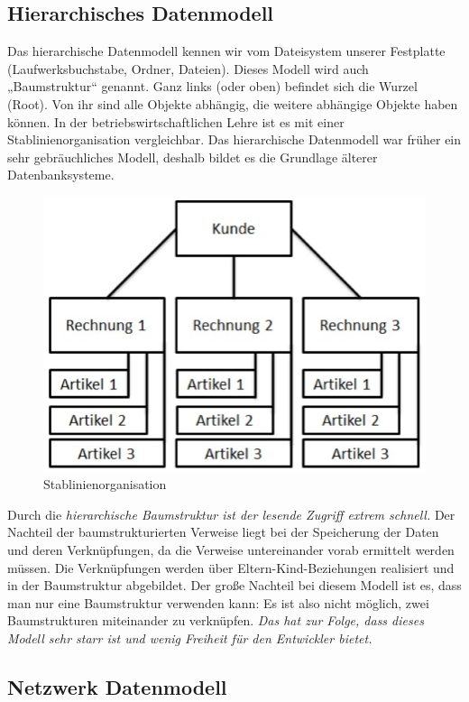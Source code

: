 \subsection{Hierarchisches Datenmodell}

Das hierarchische Datenmodell kennen wir vom Dateisystem unserer Festplatte (Laufwerksbuchstabe, Ordner, Dateien). Dieses Modell wird auch „Baumstruktur“ genannt. Ganz links (oder oben) befindet sich die Wurzel (Root). Von ihr sind alle Objekte abhängig, die weitere abhängige Objekte haben können. In der betriebswirtschaftlichen Lehre ist es mit einer Stablinienorganisation vergleichbar. Das hierarchische Datenmodell war früher ein sehr gebräuchliches Modell, deshalb bildet es die Grundlage älterer Datenbanksysteme.

\begin{figure}[h]
    \centering
    \includegraphics[width=.75\textwidth]{Content/images/modellierung/stablinien.png}
    \caption{Stablinienorganisation}
    \label{fig:modellierung:stablinien}
 \end{figure}

 Durch die \emph{hierarchische Baumstruktur ist der lesende Zugriff extrem schnell.} Der Nachteil der baumstrukturierten Verweise liegt bei der Speicherung der Daten und deren Verknüpfungen, da die Verweise untereinander vorab ermittelt werden müssen. Die Verknüpfungen werden über Eltern-Kind-Beziehungen realisiert und in der Baumstruktur abgebildet. Der große Nachteil bei diesem Modell ist es, dass man nur eine Baumstruktur verwenden kann: Es ist also nicht möglich, zwei Baumstrukturen miteinander zu verknüpfen. \emph{Das hat zur Folge, dass dieses Modell sehr starr ist und wenig Freiheit für den Entwickler bietet. }

 \subsection{Netzwerk Datenmodell}

